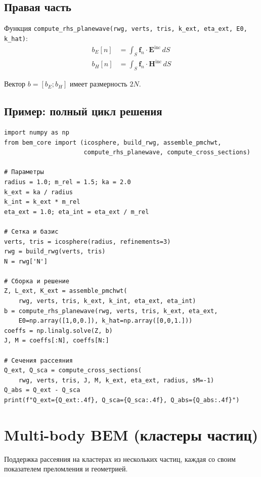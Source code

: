 \documentclass[12pt,a4paper]{article}
\begin{document}
\subsection{Правая часть}

Функция \texttt{compute\_rhs\_planewave(rwg, verts, tris, k\_ext, eta\_ext, E0, k\_hat)}:
\begin{align}
  b_E[n] &= \int_S \mathbf{f}_n \cdot \mathbf{E}^{\mathrm{inc}} \, dS \\
  b_H[n] &= \int_S \mathbf{f}_n \cdot \mathbf{H}^{\mathrm{inc}} \, dS
\end{align}

Вектор $b = [b_E; b_H]$ имеет размерность $2N$.

\subsection{Пример: полный цикл решения}

\begin{lstlisting}
import numpy as np
from bem_core import (icosphere, build_rwg, assemble_pmchwt,
                      compute_rhs_planewave, compute_cross_sections)

# Параметры
radius = 1.0; m_rel = 1.5; ka = 2.0
k_ext = ka / radius
k_int = k_ext * m_rel
eta_ext = 1.0; eta_int = eta_ext / m_rel

# Сетка и базис
verts, tris = icosphere(radius, refinements=3)
rwg = build_rwg(verts, tris)
N = rwg['N']

# Сборка и решение
Z, L_ext, K_ext = assemble_pmchwt(
    rwg, verts, tris, k_ext, k_int, eta_ext, eta_int)
b = compute_rhs_planewave(rwg, verts, tris, k_ext, eta_ext,
    E0=np.array([1,0,0.]), k_hat=np.array([0,0,1.]))
coeffs = np.linalg.solve(Z, b)
J, M = coeffs[:N], coeffs[N:]

# Сечения рассеяния
Q_ext, Q_sca = compute_cross_sections(
    rwg, verts, tris, J, M, k_ext, eta_ext, radius, sM=-1)
Q_abs = Q_ext - Q_sca
print(f"Q_ext={Q_ext:.4f}, Q_sca={Q_sca:.4f}, Q_abs={Q_abs:.4f}")
\end{lstlisting}


\section{Multi-body BEM (кластеры частиц)}

Поддержка рассеяния на кластерах из нескольких частиц, каждая со своим показателем преломления и геометрией.
\end{document}
